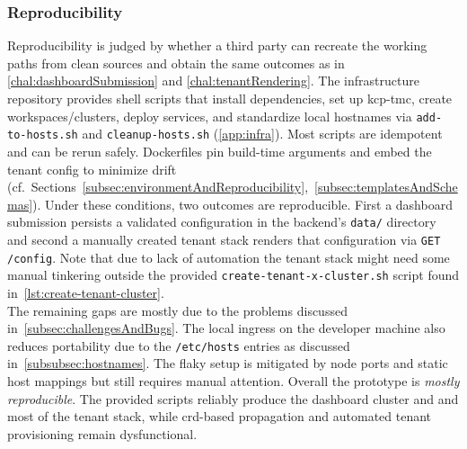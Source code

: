 \documentclass[11pt, a4paper, oneside, listof=totoc]{scrartcl}
\begin{document}
            \subsubsection{Reproducibility}\label{subsubsec:evalReproducibility}
                Reproducibility is judged by whether a third party can recreate the working paths
                from clean sources and obtain the same outcomes as in
                \autoref{chal:dashboardSubmission} and \autoref{chal:tenantRendering}.
                The infrastructure repository provides shell scripts that install dependencies, set
                up \gls{kcp}-\gls{tmc}, create workspaces/clusters, deploy services, and standardize
                local hostnames via \texttt{add-to-hosts.sh} and \texttt{cleanup-hosts.sh}
                (\autoref{app:infra}).
                Most scripts are idempotent and can be rerun safely.
                Dockerfiles pin build-time arguments and embed the tenant config to minimize drift
                (cf.\ Sections~\autoref{subsec:environmentAndReproducibility},~\autoref{subsec:templatesAndSchemas}).
                Under these conditions, two outcomes are reproducible.
                First a dashboard submission persists a validated configuration in the backend's
                \texttt{data/} directory and second a manually created tenant stack renders that
                configuration via \texttt{GET /config}.
                Note that due to lack of automation the tenant stack might need some manual
                tinkering outside the provided \texttt{create-tenant-x-cluster.sh} script found
                in~\autoref{lst:create-tenant-cluster}.\\
                The remaining gaps are mostly due to the problems discussed
                in~\autoref{subsec:challengesAndBugs}.
                The local ingress on the developer machine also reduces portability due to the
                \texttt{/etc/hosts} entries as discussed in~\autoref{subsubsec:hostnames}.
                The flaky setup is mitigated by node ports and static host mappings but still
                requires manual attention. Overall the prototype is \emph{mostly reproducible}.
                The provided scripts reliably produce the dashboard cluster and and most of the
                tenant stack, while \gls{crd}-based propagation and automated tenant provisioning
                remain dysfunctional.
\end{document}
